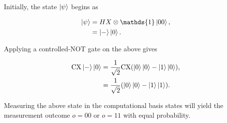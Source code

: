Initially, the state $\ket{\psi}$ begins as 

\begin{align}
	\ket{\psi} &= H X  \otimes  \mathds{1} \ket{00}, \nonumber \\
	&= \ket{-}\ket{0}.
\end{align}

Applying a controlled-NOT gate on the above gives

\begin{align}
	\text{CX}\ket{-}\ket{0} &= \frac{1}{\sqrt{2}}\text{CX}(\ket{0}\ket{0}  - \ket{1}\ket{0}),\nonumber \\
	&= \frac{1}{\sqrt{2}}(\ket{0}\ket{0} - \ket{1}\ket{1}).
\end{align}

\noindent
Measuring the above state in the computational basis states will yield the measurement outcome $o=00$ or $o=11$ with equal probability.


